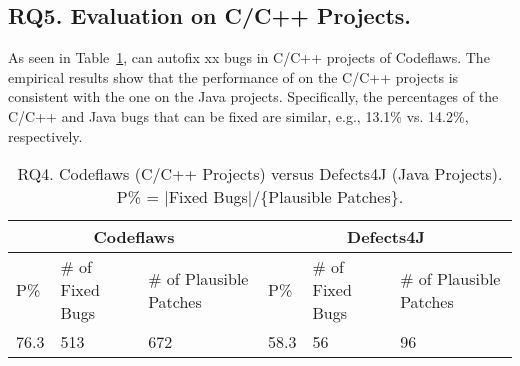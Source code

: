 \subsection{\bf RQ5. Evaluation on C/C++ Projects.}







As seen in Table~\ref{RQ5}, {\tool} can autofix xx bugs in C/C++ projects of Codeflaws. 
The empirical results show that the performance of
{\tool} on the C/C++ projects is consistent with the one on the Java
projects. Specifically, the percentages of the C/C++ and Java bugs that can be fixed are similar, e.g., 13.1\% vs. 14.2\%, respectively. 


\begin{table}[t]
	\caption{RQ4. Codeflaws (C/C++ Projects) versus Defects4J (Java Projects). P\% = $|$Fixed Bugs$|$/\{Plausible Patches\}.}
	\vspace{-5pt}
	{\small
		\begin{center}
			\tabcolsep 2.7pt
			\begin{tabular}{p{0.3cm}<{\centering}|p{1.5cm}<{\centering}|p{1.55cm}<{\centering}|p{0.3cm}<{\centering}|p{1.5cm}<{\centering}|p{1.55cm}<{\centering}}\hline	
				
				\multicolumn{3}{c|}{Codeflaws } & \multicolumn{3}{c}{Defects4J}\\\hline
				 P\%& \# of Fixed Bugs& \# of Plausible Patches &P\%& \# of Fixed Bugs & \# of Plausible Patches \\ \hline
				
				  76.3  &        513       &            672             &  58.3 &          56        &        96                 \\ 
				\hline

			\end{tabular}
			\label{RQ5}
		\end{center}
	}
\end{table}
